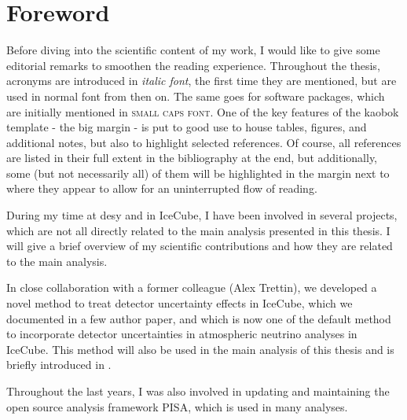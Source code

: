 \chapter*{Foreword}

Before diving into the scientific content of my work, I would like to give some editorial remarks to smoothen the reading experience. Throughout the thesis, acronyms are introduced in \textit{italic font}, the first time they are mentioned, but are used in normal font from then on. The same goes for software packages, which are initially mentioned in \textsc{small caps font}. One of the key features of the kaobok template - the big margin - is put to good use to house tables, figures, and additional notes, but also to highlight selected references. Of course, all references are listed in their full extent in the bibliography at the end, but additionally, some (but not necessarily all) of them will be highlighted in the margin next to where they appear to allow for an uninterrupted flow of reading.


During my time at desy and in IceCube, I have been involved in several projects, which are not all directly related to the main analysis presented in this thesis. I will give a brief overview of my scientific contributions and how they are related to the main analysis.

In close collaboration with a former colleague (Alex Trettin), we developed a novel method to treat detector uncertainty effects in IceCube, which we documented in a few author paper, and which is now one of the default method to incorporate detector uncertainties in atmospheric neutrino analyses in IceCube. This method will also be used in the main analysis of this thesis and is briefly introduced in .

Throughout the last years, I was also involved in updating and maintaining the open source analysis framework PISA, which is used in many analyses.




